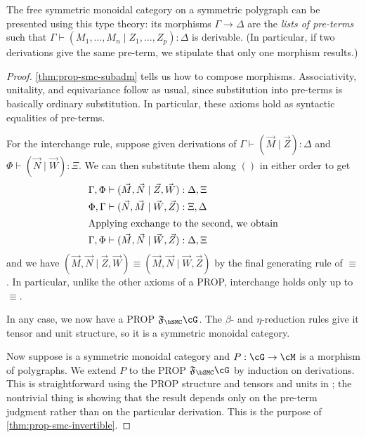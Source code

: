 \documentclass{book}
\let\types\vdash
\newcommand{\F}[1]{\mathfrak{F}_{#1}}
\begin{document}
\begin{thm}\label{thm:prop-smc-initial}
  The free symmetric monoidal category on a symmetric polygraph can be presented using this type theory: its morphisms $\Gamma\to\Delta$ are the \emph{lists of pre-terms} such that $\Gamma\types (M_1,\dots,M_n \mid Z_1,\dots,Z_p):\Delta$ is derivable.
  (In particular, if two derivations give the same pre-term, we stipulate that only one morphism results.)
\end{thm}
\begin{proof}
  \cref{thm:prop-smc-subadm} tells us how to compose morphisms.
  Associativity, unitality, and equivariance follow as usual, since substitution into pre-terms is basically ordinary substitution.
  In particular, these axioms hold as syntactic equalities of pre-terms.

  For the interchange rule, suppose given derivations of $\Gamma\types (\vec M\mid\vec Z):\Delta$ and $\Phi\types (\vec N\mid\vec W):\Xi$.
  We can then substitute them along $()$ in either order to get
  \begin{align*}
    \Gamma,\Phi &\types (\vec M,\vec N\mid \vec Z,\vec W):\Delta,\Xi\\
    \Phi,\Gamma &\types (\vec N,\vec M\mid \vec W,\vec Z):\Xi,\Delta\\
\intertext{Applying exchange to the second, we obtain}
    \Gamma,\Phi &\types (\vec M,\vec N\mid \vec W,\vec Z):\Delta,\Xi
  \end{align*}
  and we have $(\vec M,\vec N\mid \vec Z,\vec W) \equiv (\vec M,\vec N\mid \vec W,\vec Z)$ by the final generating rule of $\equiv$.
  In particular, unlike the other axioms of a PROP, interchange holds only up to $\equiv$.

  In any case, we now have a PROP $\F\bSMC\cG$.
  The $\beta$- and $\eta$-reduction rules give it tensor and unit structure, so it is a symmetric monoidal category.

  Now suppose \cM is a symmetric monoidal category and $P:\cG\to\cM$ is a morphism of polygraphs.
  We extend $P$ to the PROP $\F\bSMC\cG$ by induction on derivations.
  This is straightforward using the PROP structure and tensors and units in \cM; the nontrivial thing is showing that the result depends only on the pre-term judgment rather than on the particular derivation.
  This is the purpose of \cref{thm:prop-smc-invertible}.


\end{proof}
\end{document}

